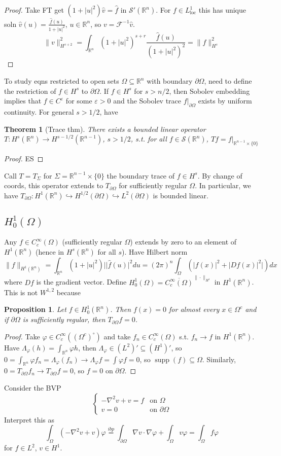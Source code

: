 \documentclass{article}
\newcommand{\e}{\varepsilon}
\theoremstyle{definition}
\theoremstyle{remark}
\theoremstyle{plain}
\newtheorem{thm}[defn]{Theorem}
\newtheorem{prop}[defn]{Proposition}
\newcommand{\RR}{\mathbb{R}}
\begin{document}
\begin{proof}
    Take FT get $(1+|u|^2)\hat v=\hat f$ in $\mathcal S'(\RR^n)$. For $f\in L^1_{\text{loc}}$ this has unique soln $\hat v(u)=\frac{\hat f(u)}{1+|u|^2}$, $u\in\RR^n$, so $v=\mathcal F^{-1}\hat v$.
    \[\|v\|^2_{H^{s+2}}=\int_{\RR^n}(1+|u|^2)^{s+r}\frac{\hat f(u)}{(1+|u|^2)^{2}}=\|f\|^2_{H^s}\]
\end{proof}
To study eqns restricted to open sets $\Omega\subseteq\RR^n$ with boundary $\partial\Omega$, need to define the restriction of $f\in H^s$ to $\partial \Omega$. If $f\in H^s$ for $s>n/2$, then Sobolev embedding implies that $f\in C^\e$ for some $\e>0$ and the Sobolev trace $f|_{\partial\Omega}$ exists by uniform continuity. For general $s>1/2$, have
\begin{thm}[Trace thm]
    There exists a bounded linear operator $T:H^s(\RR^n)\to H^{s-1/2}(\RR^{n-1})$, $s>1/2$, s.t. for all $f\in \mathcal S(\RR^n)$, $Tf=f|_{\RR^{n-1}\times \{0\}}$
\end{thm}
\begin{proof}
    ES
\end{proof}
Call $T= T_\Sigma$ for $\Sigma=\RR^{n-1}\times\{0\}$ the boundary trace of $f\in H^s$. By change of coords, this operator extends to $T_{\partial\Omega}$ for sufficiently regular $\Omega$. In particular, we have $T_{\partial\Omega}:H^1(\RR^n)\hookrightarrow H^{1/2}(\partial\Omega)\hookrightarrow L^2(\partial\Omega)$ is bounded linear.
\subsection{$H_0^1(\Omega)$}
Any $f\in C_c^\infty(\Omega)$ (sufficiently regular $\Omega$) extends by zero to an element of $H^1(\RR^n)$ (hence in $H^s(\RR^n)$ for all $s$). Have Hilbert norm
\[\|f\|_{H^1(\RR^n)}=\int_{\RR^n}(1+|u|^2)||\hat f(u)|^2du=(2\pi)^n\int_\Omega(|f(x)|^2+|Df(x)|^2|)dx\] where $Df$ is the gradient vector. Define $H_0^1(\Omega)=\overline{C_c^\infty(\Omega)}^{\|\cdot\|_{H^1}}$ in $H^1(\RR^n)$. This is not $W^{1,2}$ because
\begin{prop}
    Let $f\in H_0^1(\RR^n)$. Then $f(x)=0$ for almost every $x\in\Omega^c$ and if $\partial \Omega$ is sufficiently regular, then $T_{\partial\Omega} f=0$.
\end{prop}
\begin{proof}
    Take $\varphi\in C_c^\infty((\Omega^c)^\circ)$ and take $f_n\in C_c^\infty(\Omega)$ s.t. $f_n\to f$ in $H^1(\RR^n)$. Have $\Lambda_\varphi(h)=\int_{\RR^n}\varphi h$, then $\Lambda_\varphi\in (L^2)'\subseteq(H^1)'$, so $0=\int_{\RR^n}\varphi f_n=\Lambda_\varphi(f_n)\to\Lambda_\varphi f=\int\varphi f=0$, so $\operatorname{supp}(f)\subseteq\Omega$. Similarly, $0=T_{\partial \Omega}f_n\to T_{\partial \Omega}f=0$, so $f=0$ on $\partial\Omega$.
\end{proof}
Consider the BVP 
\[\begin{cases}
    -\nabla^2v+v=f & \text{on }\Omega\\
    v=0 & \text{on }\partial\Omega
\end{cases}\]
Interpret this as
\[\int_\Omega(-\nabla^2v+v)\varphi\overset{ibp}{=}\int_{\partial\Omega}\nabla v\cdot\nabla\varphi+\int_\Omega v\varphi=\int_\Omega f\varphi\] for $f\in L^2$, $v\in H^1$.
\end{document}
